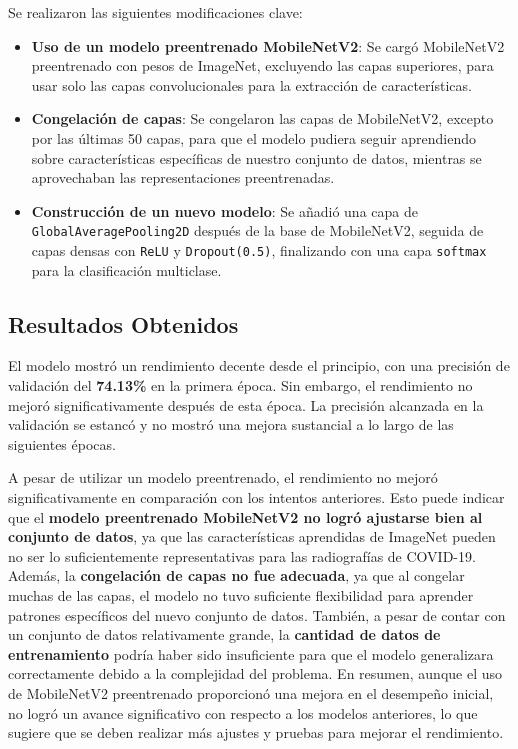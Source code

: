 \documentclass{article}
\begin{document}
	Se realizaron las siguientes modificaciones clave:
	
\begin{itemize}
	\item \textbf{Uso de un modelo preentrenado MobileNetV2}: Se cargó MobileNetV2 preentrenado con pesos de ImageNet, excluyendo las capas superiores, para usar solo las capas convolucionales para la extracción de características.
	\item \textbf{Congelación de capas}: Se congelaron las capas de MobileNetV2, excepto por las últimas 50 capas, para que el modelo pudiera seguir aprendiendo sobre características específicas de nuestro conjunto de datos, mientras se aprovechaban las representaciones preentrenadas.
	\item \textbf{Construcción de un nuevo modelo}: Se añadió una capa de \texttt{GlobalAveragePooling2D} después de la base de MobileNetV2, seguida de capas densas con \texttt{ReLU} y \texttt{Dropout(0.5)}, finalizando con una capa \texttt{softmax} para la clasificación multiclase.
\end{itemize}

\subsection{Resultados Obtenidos}

El modelo mostró un rendimiento decente desde el principio, con una precisión de validación del \textbf{74.13\%} en la primera época. Sin embargo, el rendimiento no mejoró significativamente después de esta época. La precisión alcanzada en la validación se estancó y no mostró una mejora sustancial a lo largo de las siguientes épocas.

A pesar de utilizar un modelo preentrenado, el rendimiento no mejoró significativamente en comparación con los intentos anteriores. Esto puede indicar que el \textbf{modelo preentrenado MobileNetV2 no logró ajustarse bien al conjunto de datos}, ya que las características aprendidas de ImageNet pueden no ser lo suficientemente representativas para las radiografías de COVID-19. Además, la \textbf{congelación de capas no fue adecuada}, ya que al congelar muchas de las capas, el modelo no tuvo suficiente flexibilidad para aprender patrones específicos del nuevo conjunto de datos. También, a pesar de contar con un conjunto de datos relativamente grande, la \textbf{cantidad de datos de entrenamiento} podría haber sido insuficiente para que el modelo generalizara correctamente debido a la complejidad del problema. En resumen, aunque el uso de MobileNetV2 preentrenado proporcionó una mejora en el desempeño inicial, no logró un avance significativo con respecto a los modelos anteriores, lo que sugiere que se deben realizar más ajustes y pruebas para mejorar el rendimiento.
\end{document}
